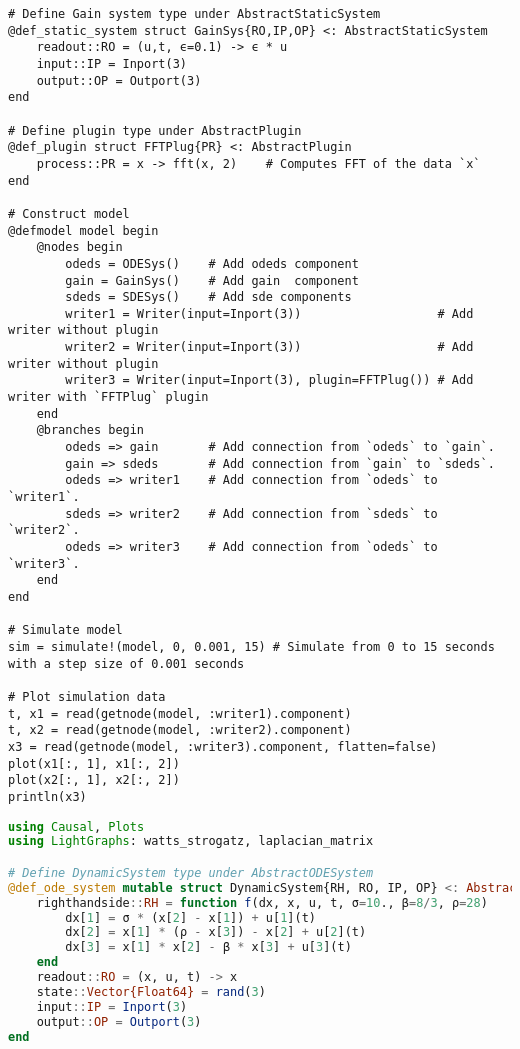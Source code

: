 \documentclass{juliacon}
\begin{document}
{\begin{lstlisting}
# Define Gain system type under AbstractStaticSystem
@def_static_system struct GainSys{RO,IP,OP} <: AbstractStaticSystem 
    readout::RO = (u,t, ϵ=0.1) -> ϵ * u 
    input::IP = Inport(3)
    output::OP = Outport(3)
end 

# Define plugin type under AbstractPlugin
@def_plugin struct FFTPlug{PR} <: AbstractPlugin 
    process::PR = x -> fft(x, 2)    # Computes FFT of the data `x`
end 

# Construct model
@defmodel model begin 
    @nodes begin 
        odeds = ODESys()    # Add odeds component  
        gain = GainSys()    # Add gain  component   
        sdeds = SDESys()    # Add sde components
        writer1 = Writer(input=Inport(3))                   # Add writer without plugin
        writer2 = Writer(input=Inport(3))                   # Add writer without plugin
        writer3 = Writer(input=Inport(3), plugin=FFTPlug()) # Add writer with `FFTPlug` plugin
    end
    @branches begin 
        odeds => gain       # Add connection from `odeds` to `gain`.
        gain => sdeds       # Add connection from `gain` to `sdeds`.
        odeds => writer1    # Add connection from `odeds` to `writer1`.
        sdeds => writer2    # Add connection from `sdeds` to `writer2`.
        odeds => writer3    # Add connection from `odeds` to `writer3`.
    end 
end 

# Simulate model 
sim = simulate!(model, 0, 0.001, 15) # Simulate from 0 to 15 seconds with a step size of 0.001 seconds

# Plot simulation data 
t, x1 = read(getnode(model, :writer1).component)
t, x2 = read(getnode(model, :writer2).component)
x3 = read(getnode(model, :writer3).component, flatten=false)
plot(x1[:, 1], x1[:, 2])
plot(x2[:, 1], x2[:, 2])   
println(x3)  
\end{lstlisting}

\begin{lstlisting}[caption={Program using Causal.jl for the simulation of the system in Figure \ref{fig: network graph}. Plots.jl is used to plot the simulation data while LightGraphs.jl is used to construct the connectiviy matrix of the network topology \cite{plots, lightgraphs}}, label={lst: network codes}, language=Julia]
using Causal, Plots
using LightGraphs: watts_strogatz, laplacian_matrix

# Define DynamicSystem type under AbstractODESystem
@def_ode_system mutable struct DynamicSystem{RH, RO, IP, OP} <: AbstractODESystem
    righthandside::RH = function f(dx, x, u, t, σ=10., β=8/3, ρ=28)
        dx[1] = σ * (x[2] - x[1]) + u[1](t)
        dx[2] = x[1] * (ρ - x[3]) - x[2] + u[2](t)
        dx[3] = x[1] * x[2] - β * x[3] + u[3](t)
    end
    readout::RO = (x, u, t) -> x
    state::Vector{Float64} = rand(3)
    input::IP = Inport(3)
    output::OP = Outport(3) 
end  


\end{lstlisting}}
\end{document}
